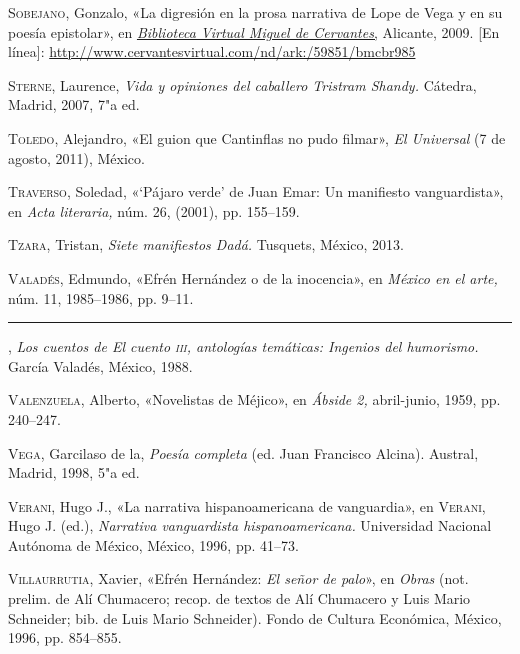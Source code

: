 \documentclass[14pt,twoside,final]{extbook} %
\begin{document}
\textsc{Sobejano}, Gonzalo, «La digresión en la prosa narrativa de Lope de Vega y en su poesía epistolar», en \href{http://www.cervantesvirtual.com/}{\emph{Biblioteca Virtual Miguel de Cervantes},} Alicante, 2009. [En línea]: \url{http://www.cervantesvirtual.com/nd/ark:/59851/bmcbr985}\label{bib:sobejano2009}

\textsc{Sterne}, Laurence, \emph{Vida y opiniones del caballero Tristram Shandy.} Cátedra, Madrid, 2007, 7"a ed.\label{bib:sterne2007}

\textsc{Toledo}, Alejandro, «El guion que Cantinflas no pudo filmar», \emph{El Universal} (7 de agosto, 2011), México.\label{bib:toledo2011}

\textsc{Traverso}, Soledad, «`Pájaro verde' de Juan Emar: Un manifiesto vanguardista», en \emph{Acta literaria,} núm. 26, (2001), pp. 155--159.\label{bib:traverso2001}

\textsc{Tzara}, Tristan, \emph{Siete manifiestos Dadá.} Tusquets, México, 2013.\label{bib:tzara2013}

\textsc{Valadés}, Edmundo, «Efrén Hernández o de la inocencia», en \emph{México en el arte,} núm. 11, 1985--1986, pp. 9--11.\label{bib:valades1985}

\rule{1cm}{0.4pt}, \emph{Los cuentos de \emph{El cuento} \textsc{iii}, antologías temáticas: Ingenios del humorismo.} García Valadés, México, 1988.\label{bib:valades1988}

\textsc{Valenzuela}, Alberto, «Novelistas de Méjico», en \emph{Ábside 2,} abril-junio, 1959, pp. 240--247.\label{bib:valenzuela1959}

\textsc{Vega}, Garcilaso de la, \emph{Poesía completa} (ed. Juan Francisco Alcina). Austral, Madrid, 1998, 5"a ed.\label{bib:vega1998}

\textsc{Verani}, Hugo J., «La narrativa hispanoamericana de vanguardia», en \textsc{Verani}, Hugo J. (ed.),  \emph{Narrativa vanguardista hispanoamericana.} Universidad Nacional Autónoma de México, México, 1996, pp. 41--73.\label{bib:verani1996}

\textsc{Villaurrutia}, Xavier, «Efrén Hernández: \emph{El señor de palo}», en \emph{Obras} (not. prelim. de Alí Chumacero; recop. de textos de Alí Chumacero y Luis Mario Schneider; bib. de Luis Mario Schneider). Fondo de Cultura Económica, México, 1996, pp. 854--855.\label{bib:villaurrutia1996}
\end{document}
